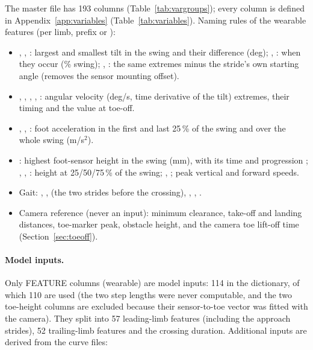 The master file has 193 columns (Table~\ref{tab:vargroups}); every column is defined in Appendix~\ref{app:variables}
(Table~\ref{tab:variables}). Naming rules of the wearable features (per limb, prefix  or ):

\begin{itemize}
  \item {}, , : largest and smallest tilt in the swing and their difference (deg);
  , : when they occur (\% swing); , : the same extremes minus the
  stride's own starting angle (removes the sensor mounting offset).
  \item {}, , , , : angular velocity (deg/s, time
  derivative of the tilt) extremes, their timing and the value at toe-off.
  \item {}, , : foot acceleration in the first and last
  25\,\% of the swing and over the whole swing (m/s$^2$).
  \item {}: highest foot-sensor height in the swing (mm), with its time  and progression
  ; , , : height at 25/50/75\,\% of the swing; ,
  ; peak vertical and forward speeds.
  \item Gait: , ,  (the two strides before the crossing),
  , , .
  \item Camera reference (never an input): minimum clearance, take-off and landing distances, toe-marker peak, obstacle
  height, and the camera toe lift-off time  (Section~\ref{sec:toeoff}).
\end{itemize}

\begin{table}[htbp]
\centering
\caption{Column groups of  and their roles.}
\label{tab:vargroups}
\small

\end{table}

\paragraph{Model inputs.} Only FEATURE columns (wearable) are model inputs: 114 in the dictionary, of which 110 are used
(the two step lengths were never computable, and the two toe-height columns are excluded because their sensor-to-toe vector
was fitted with the camera). They split into 57 leading-limb features (including the approach strides), 52 trailing-limb
features and the crossing duration. Additional inputs are derived from the curve files:

